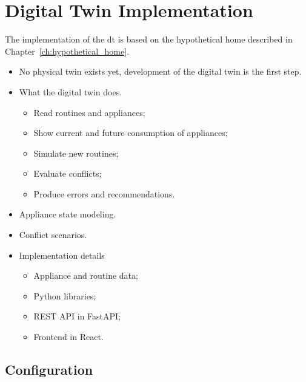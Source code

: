 \chapter{Digital Twin Implementation}\label{ch:implementation}

The implementation of the \acrshort{dt} is based on the hypothetical home described in Chapter~\ref{ch:hypothetical_home}. 

\begin{itemize}
    \item No physical twin exists yet, development of the digital twin is the first step.
    \item What the digital twin does.
        \begin{itemize}
            \item Read routines and appliances;
            \item Show current and future consumption of appliances;
            \item Simulate new routines;
            \item Evaluate conflicts;
            \item Produce errors and recommendations.
        \end{itemize}
    \item Appliance state modeling.
    \item Conflict scenarios.
    \item Implementation details
        \begin{itemize}
            \item Appliance and routine data;
            \item Python libraries;
            \item REST API in FastAPI;
            \item Frontend in React.
        \end{itemize}
\end{itemize}

\section{Configuration}



